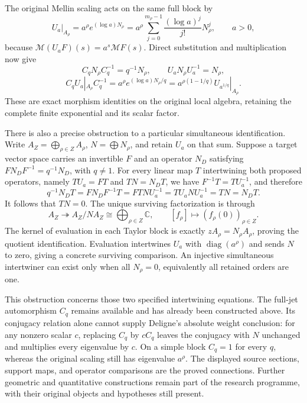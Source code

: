 The original Mellin scaling acts on the same full
block by
\[
U_a|_{A_\rho}
=a^\rho e^{(\log a)N_\rho}
=a^\rho\sum_{j=0}^{m_\rho-1}
\frac{(\log a)^j}{j!}N_\rho^j,\qquad a>0,
\]
because \(\mathcal M(U_aF)(s)=a^s\mathcal MF(s)\).
Direct substitution and multiplication now give
\[
C_qN_\rho C_q^{-1}=q^{-1}N_\rho,\qquad
U_aN_\rho U_a^{-1}=N_\rho,
\]
\[
C_qU_a|_{A_\rho}C_q^{-1}
=a^\rho e^{(\log a)N_\rho/q}
=a^{\rho(1-1/q)}U_{a^{1/q}}|_{A_\rho}.
\]
These are exact morphism identities on the original
local algebra, retaining the complete finite
exponential and its scalar factor.

There is also a precise obstruction to a particular
simultaneous identification. Write
\(A_Z=\bigoplus_{\rho\in Z}A_\rho\),
\(N=\bigoplus N_\rho\), and retain \(U_a\) on that
sum. Suppose a target vector space carries an
invertible \(F\) and an operator \(N_D\) satisfying
\(FN_DF^{-1}=q^{-1}N_D\), with \(q\ne1\).
For every linear map \(T\) intertwining both proposed
operators, namely \(TU_a=FT\) and \(TN=N_DT\),
we have \(F^{-1}T=TU_a^{-1}\), and therefore
\[
q^{-1}N_DT
=FN_DF^{-1}T
=FTNU_a^{-1}
=TU_aNU_a^{-1}
=TN=N_DT.
\]
It follows that \(TN=0\). The unique surviving
factorization is through
\[
A_Z\twoheadrightarrow A_Z/NA_Z
\cong\bigoplus_{\rho\in Z}\mathbb C,
\qquad [f_\rho]\longmapsto(f_\rho(0))_{\rho\in Z}.
\]
The kernel of evaluation in each Taylor block is
exactly \(zA_\rho=N_\rho A_\rho\), proving the
quotient identification. Evaluation intertwines
\(U_a\) with \(\operatorname{diag}(a^\rho)\) and
sends \(N\) to zero, giving a concrete surviving
comparison. An injective simultaneous intertwiner
can exist only when all \(N_\rho=0\), equivalently
all retained orders are one.

This obstruction concerns those two specified
intertwining equations. The full-jet automorphism
\(C_q\) remains available and has already been
constructed above. Its conjugacy relation alone
cannot supply Deligne's absolute weight conclusion:
for any nonzero scalar \(c\), replacing \(C_q\)
by \(cC_q\) leaves the conjugacy with \(N\)
unchanged and multiplies every eigenvalue by \(c\).
On a simple block \(C_q=1\) for every \(q\),
whereas the original scaling still has eigenvalue
\(a^\rho\). The displayed source sections,
support maps, and operator comparisons are the
proved connections. Further geometric and
quantitative constructions remain part of the
research programme, with their original objects
and hypotheses still present.
